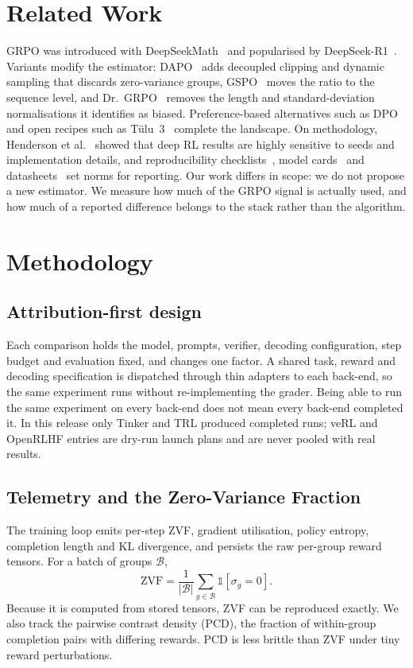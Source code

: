 \documentclass[conference]{IEEEtran}
\begin{document}
\section{Related Work}

GRPO was introduced with DeepSeekMath~\cite{shao2024deepseekmath} and
popularised by DeepSeek-R1~\cite{guo2025deepseekr1}. Variants modify the
estimator: DAPO~\cite{yu2025dapo} adds decoupled clipping and dynamic sampling
that discards zero-variance groups, GSPO~\cite{qwen2025gspo} moves the ratio to
the sequence level, and Dr.\ GRPO~\cite{liu2025understanding} removes the
length and standard-deviation normalisations it identifies as biased.
Preference-based alternatives such as DPO~\cite{rafailov2024direct} and open
recipes such as T\"ulu~3~\cite{lambert2024tulu3} complete the landscape. On
methodology, Henderson et al.~\cite{henderson2018deep} showed that deep RL
results are highly sensitive to seeds and implementation details, and
reproducibility checklists~\cite{pineau2020improving}, model
cards~\cite{mitchell2019modelcards} and datasheets~\cite{gebru2021datasheets}
set norms for reporting. Our work differs in scope: we do not propose a new
estimator. We measure how much of the GRPO signal is actually used, and how
much of a reported difference belongs to the stack rather than the algorithm.

\section{Methodology}

\subsection{Attribution-first design}
Each comparison holds the model, prompts, verifier, decoding configuration,
step budget and evaluation fixed, and changes one factor. A shared task,
reward and decoding specification is dispatched through thin adapters to each
back-end, so the same experiment runs without re-implementing the grader.
Being able to run the same experiment on every back-end does not mean every
back-end completed it. In this release only Tinker and TRL produced completed
runs; veRL and OpenRLHF entries are dry-run launch plans and are never pooled
with real results.

\subsection{Telemetry and the Zero-Variance Fraction}
The training loop emits per-step ZVF, gradient utilisation, policy entropy,
completion length and KL divergence, and persists the raw per-group reward
tensors. For a batch of groups $\mathcal{B}$,
\begin{equation}
\mathrm{ZVF} = \frac{1}{|\mathcal{B}|}\sum_{g\in\mathcal{B}}
\mathbb{1}\left[\sigma_g = 0\right].
\end{equation}
Because it is computed from stored tensors, ZVF can be reproduced exactly.
We also track the pairwise contrast density (PCD), the fraction of
within-group completion pairs with differing rewards. PCD is less brittle
than ZVF under tiny reward perturbations.
\end{document}
